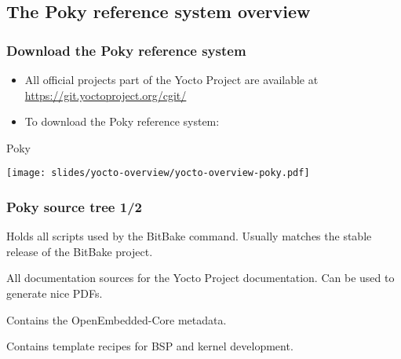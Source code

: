 \subsection{The Poky reference system overview}

\begin{frame}
  \frametitle{Download the Poky reference system}
  \begin{itemize}
    \item All official projects part of the Yocto Project are
          available at \url{https://git.yoctoproject.org/cgit/}
    \item To download the Poky reference system: \\
          {\small
          }
  \end{itemize}
\end{frame}

\begin{frame}{Poky}
  \begin{center}
    \texttt{[image: slides/yocto-overview/yocto-overview-poky.pdf]}
  \end{center}
\end{frame}

\begin{frame}
  \frametitle{Poky source tree 1/2}
  \begin{description}[style=nextline]
  \item[bitbake/] Holds all scripts used by the BitBake command.
    Usually matches the stable release of the BitBake project.
  \item[documentation/] All documentation sources for the Yocto
    Project documentation. Can be used to generate nice PDFs.
  \item[meta/] Contains the OpenEmbedded-Core metadata.
  \item[meta-skeleton/] Contains template recipes for BSP and
    kernel development.
  \end{description}
\end{frame}

